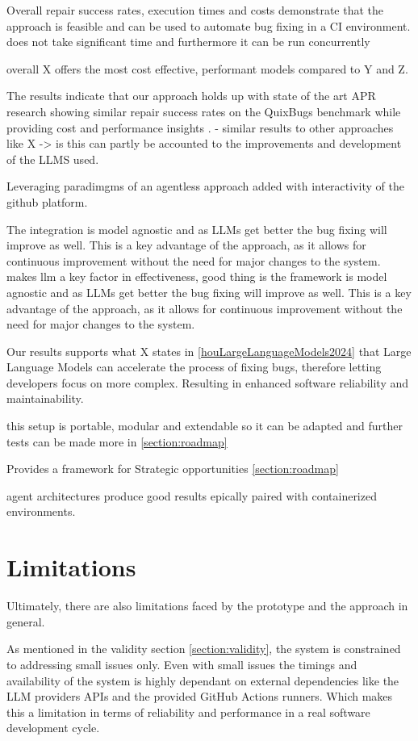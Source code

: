 Overall repair success rates, execution times and costs demonstrate that the approach is feasible and can be used to automate bug fixing in a CI environment.
does not take significant time and furthermore it can be run concurrently

overall X offers the most cost effective, performant models compared to Y and Z.

The results indicate that our approach holds up with state of the art APR research showing similar repair success rates on the QuixBugs benchmark while providing cost and performance insights .
- similar results to other approaches like X -> is
this can partly be accounted to the improvements and development of the LLMS used.

Leveraging paradimgms of an agentless approach added with interactivity of the github platform.

The integration is model agnostic and as LLMs get better the bug fixing will improve as well. This is a key advantage of the approach, as it allows for continuous improvement without the need for major changes to the system.
makes llm a key factor in effectiveness, good thing is the framework is model agnostic and as LLMs get better the bug fixing will improve as well. This is a key advantage of the approach, as it allows for continuous improvement without the need for major changes to the system.


Our results supports what X states in \ref{houLargeLanguageModels2024} that Large Language Models can accelerate the process of fixing bugs, therefore letting developers focus on more complex. Resulting in enhanced software reliability and maintainability.


this setup is portable, modular and extendable so it can be adapted and further tests can be made more in \ref{section:roadmap}

Provides a framework for Strategic opportunities \ref{section:roadmap}

agent architectures produce good results epically paired with containerized environments. \cite{puvvadiCodingAgentsComprehensive2025}

\section{Limitations}
Ultimately, there are also limitations faced by the prototype and the approach in general.

As mentioned in the validity section \ref{section:validity}, the system is constrained to addressing small issues only. Even with small issues the timings and availability of the system is highly dependant on external dependencies like the LLM providers APIs and the provided GitHub Actions runners. Which makes this a limitation in terms of reliability and performance in a real software development cycle.

